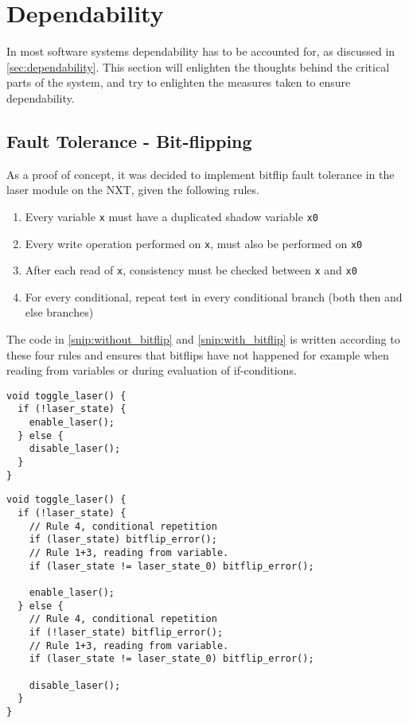 \section{Dependability}\label{Design:Dependability}
In most software systems dependability has to be accounted for, as discussed in \autoref{sec:dependability}.
This section will enlighten the thoughts behind the critical parts of the system, and try to enlighten the measures taken to ensure dependability.

\subsection{Fault Tolerance - Bit-flipping}
As a proof of concept, it was decided to implement bitflip fault tolerance in the laser module on the NXT, given the following rules.

\begin{enumerate}
  \item Every variable \texttt{x} must have a duplicated shadow variable \texttt{x0}\cite{errorDetectionSoft}
  \item Every write operation performed on \texttt{x}, must also be performed on \texttt{x0}\cite{errorDetectionSoft}
  \item After each read of \texttt{x}, consistency must be checked between \texttt{x} and \texttt{x0}\cite{errorDetectionSoft}
  \item For every conditional, repeat test in every conditional branch (both then and else branches)\cite{errorDetectionSoft}
\end{enumerate}

The code in \autoref{snip:without_bitflip} and \autoref{snip:with_bitflip} is written according to these four rules and ensures that bitflips have not happened for example when reading from variables or during evaluation of if-conditions.

\noindent\begin{minipage}{.45\textwidth}
\begin{lstlisting}[label={snip:without_bitflip},caption={Without~bitflip-security},frame=tlrb,numbers=none]
void toggle_laser() {
  if (!laser_state) {
    enable_laser();
  } else {
    disable_laser();
  }
}
\end{lstlisting}
\end{minipage}\hfill
\begin{minipage}{.45\textwidth}
\begin{lstlisting}[label={snip:with_bitflip},caption={With bitflip-security},frame=tlrb,numbers=none]
void toggle_laser() {
  if (!laser_state) {
    // Rule 4, conditional repetition
    if (laser_state) bitflip_error();
    // Rule 1+3, reading from variable.
    if (laser_state != laser_state_0) bitflip_error();

    enable_laser();
  } else {
    // Rule 4, conditional repetition
    if (!laser_state) bitflip_error();
    // Rule 1+3, reading from variable.
    if (laser_state != laser_state_0) bitflip_error();

    disable_laser();
  }
}
\end{lstlisting}
\end{minipage}

